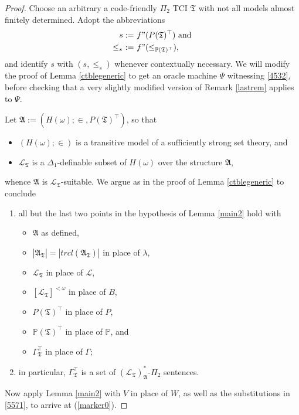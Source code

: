 \documentclass[12pt, twoside]{memoir}
\numberwithin{equation}{section}
\theoremstyle{definition}
\theoremstyle{remark}
\theoremstyle{definition}
\theoremstyle{definition}
\theoremstyle{definition}
\theoremstyle{remark}
\begin{document}
\begin{proof}
Choose an arbitrary a code-friendly $\Pi_2$ TCI $\mathfrak{T}$ with not all models almost finitely determined. Adopt the abbreviations
\begin{align*}
    s := \ & f" (P(\mathfrak{T})^{\top}) \text{ and} \\
    \leq_s \ := \ & f" (\leq_{\mathbb{P}(\mathfrak{T})^{\top}}) \text{,} 
\end{align*}
and identify $s$ with $(s, \leq_s)$ whenever contextually necessary. We will modify the proof of Lemma \ref{ctblegeneric} to get an oracle machine $\Psi$ witnessing \ref{4532}, before checking that a very slightly modified version of Remark \ref{lastrem} applies to $\Psi$. 

Let $\mathfrak{A} := (H(\omega); \in, P(\mathfrak{T})^{\top})$, so that 
\begin{itemize}
    \item $(H(\omega); \in)$ is a transitive model of a sufficiently strong set theory, and
    \item $\mathcal{L}_{\mathfrak{T}}$ is a $\Delta_1$-definable subset of $H(\omega)$ over the structure $\mathfrak{A}$,
\end{itemize}
whence $\mathfrak{A}$ is $\mathcal{L}_{\mathfrak{T}}$-suitable. We argue as in the proof of Lemma \ref{ctblegeneric} to conclude 
\begin{enumerate}[label=(\Roman*)]
    \item\label{5571} all but the last two points in the hypothesis of Lemma \ref{main2} hold with
    \begin{itemize}
        \item $\mathfrak{A}$ as defined,
        \item $|\mathfrak{A}_{\mathfrak{T}}| = |trcl(\mathfrak{A}_{\mathfrak{T}})|$ in place of $\lambda$,
        \item $\mathcal{L}_{\mathfrak{T}}$ in place of $\mathcal{L}$,
        \item $[\mathcal{L}_{\mathfrak{T}}]^{< \omega}$ in place of $B$,
        \item $P(\mathfrak{T})^{\top}$ in place of $P$,
        \item $\mathbb{P}(\mathfrak{T})^{\top}$ in place of $\mathbb{P}$, and
        \item $\Gamma_{\mathfrak{T}}^{\top}$ in place of $\Gamma$;
    \end{itemize} 
    \item\label{5572} in particular, $\Gamma_{\mathfrak{T}}^{\top}$ is a set of $(\mathcal{L}_{\mathfrak{T}})^*_{\mathfrak{A}}$-$\Pi_2$ sentences.
\end{enumerate}
Now apply Lemma \ref{main2} with $V$ in place of $W$, as well as the substitutions in \ref{5571}, to arrive at (\ref{marker0}).


\end{proof}
\end{document}
